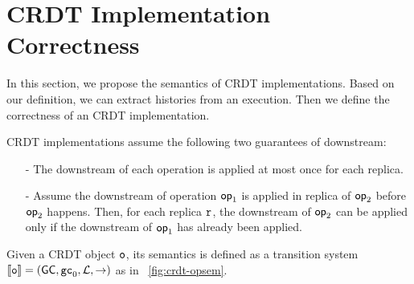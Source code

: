 
\section{CRDT Implementation Correctness}
\label{sec:CRDT implementation semantics and correctness}

In this section, we propose the semantics of CRDT implementations. Based on our definition, we can extract histories from an execution. Then we define the correctness of an CRDT implementation.




CRDT implementations assume the following two guarantees of downstream:

\begin{itemize}
\setlength{\itemsep}{0.5pt}
\item[-] The downstream of each operation is applied at most once for each replica.
\item[-] Assume the downstream of operation $\mathsf{op}_1$ is applied in replica of $\mathsf{op}_2$ before $\mathsf{op}_2$ happens. Then, for each replica $\mathtt{r}$, the downstream of $\mathsf{op}_2$ can be applied only if the downstream of $\mathsf{op}_1$ has already been applied.
\end{itemize}

Given a CRDT object $\mathtt{o}$, its semantics is defined as a transition system $\llbracket \mathtt{o} \rrbracket = (\mathsf{GC},\mathtt{gc}_0,\mathcal{L},\rightarrow)$ as in \figurename~\ref{fig:crdt-opsem}.




